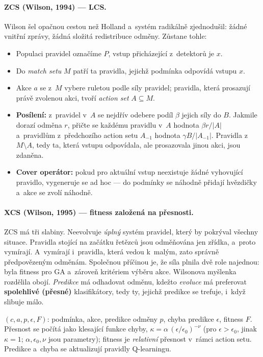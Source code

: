 \documentclass[11pt,a4paper]{article}
\theoremstyle{definition}
\begin{document}
\paragraph{ZCS (Wilson, 1994) ---  LCS.} Wilson šel opačnou cestou než
Holland a~systém radikálně zjednodušil: žádné vnitřní zprávy, žádná složitá redistribuce
odměny. Zůstane tohle:
\begin{itemize}
\item Populaci pravidel označíme $P$, vstup přicházející z~detektorů je $x$.
\item Do \emph{match setu} $M$ patří ta pravidla, jejichž podmínka odpovídá vstupu $x$.
\item Akce $a$ se z~$M$ vybere ruletou podle síly pravidel; pravidla, která prosazují
  právě zvolenou akci, tvoří \emph{action set} $A \subseteq M$.
\item \textbf{Posílení:} z~pravidel v~$A$ se nejdřív odebere podíl $\beta$ jejich síly
  do  $B$. Jakmile dorazí odměna $r$, přičte se každému pravidlu v~$A$ hodnota
  $\beta r/|A|$ a~pravidlům z~předchozího action setu $A_{-1}$ hodnota
  $\gamma B/|A_{-1}|$. Pravidla z~$M \setminus A$, tedy ta, která vstupu odpovídala,
  ale prosazovala jinou akci, jsou zdaněna.
\item \textbf{Cover operátor:} pokud pro aktuální vstup neexistuje žádné vyhovující
  pravidlo, vygeneruje se ad hoc --- do podmínky se náhodně přidají hvězdičky a~akce se
  zvolí náhodně.
\end{itemize}

\paragraph{XCS (Wilson, 1995) --- fitness založená na přesnosti.}
ZCS má tři slabiny. Neevolvuje \emph{úplný} systém pravidel, který by pokrýval všechny
situace. Pravidla stojící na začátku řetězců jsou odměňována jen zřídka, a~proto vymírají.
A~vymírají i~pravidla, která vedou k~malým, zato správně předpovězeným odměnám. Společnou
příčinou je, že síla plnila dvě role najednou: byla fitness pro GA a~zároveň kritériem
výběru akce. Wilsonova myšlenka rozdělila obojí. \emph{Predikce} má odhadovat odměnu, kdežto
\emph{evoluce} má preferovat \textbf{spolehlivé (přesné)} klasifikátory, tedy ty, jejichž
predikce se trefuje, i~když slibuje málo.

\begin{defbox}
$(c, a, p, \epsilon, F)$: podmínka, akce, predikce odměny $p$, chyba predikce
$\epsilon$, fitness $F$. Přesnost se počítá jako klesající funkce chyby,
$\kappa = \alpha\,(\epsilon/\epsilon_0)^{-\nu}$ (pro $\epsilon > \epsilon_0$,
jinak $\kappa = 1$; $\alpha, \epsilon_0, \nu$ jsou parametry);
fitness je \emph{relativní} přesnost v~rámci action setu.
Predikce a~chyba se aktualizují pravidly Q-learningu.
\end{defbox}
\end{document}

